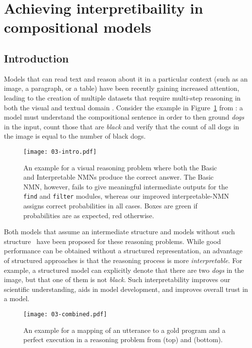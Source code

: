 \documentclass[main.tex]{subfiles}
\begin{document}
\section{Achieving interpretibaility in compositional models} %
\label{sec:nmn-interpret}

\subsection{Introduction}
Models that can read text and reason about it in a particular context (such as an image, a paragraph, or a table) have been recently gaining increased attention, leading to the creation of multiple  datasets that require multi-step reasoning in both the visual and textual domain \cite{clevr-2017,nlvr-suhr-2017,complexweb-talmor-2018,hotpotqa-2018,nlvr2-suhr-2018,gqa-hudson-2019,drop-2019}.
Consider the example in Figure~\ref{fig:03-intro} from \nlvr{}: a model must understand the compositional sentence in order to then ground \emph{dogs} in the input, count those that are \emph{black} and verify that the count of all dogs in the image is equal to the number of black dogs.


%
\begin{figure}[bh!]
    \centering
    \texttt{[image: 03-intro.pdf]}
    \caption{An example for a visual reasoning problem where both the Basic and Interpretable NMNs produce the correct answer.
    The Basic NMN, however, fails to give meaningful intermediate outputs for the \texttt{find} and \texttt{filter} modules, whereas our improved interpretable-NMN assigns correct probabilities in all cases. Boxes are green if probabilities are as expected, red otherwise.}
    \label{fig:03-intro}
\end{figure}


Both models that assume an intermediate structure \cite{nmn-2016,jiang-nmn-2019} and models without such structure~\cite{lxmert-hao-2019,mtmsn-2019,compositional-min-2019} have been proposed for these reasoning problems.
While good performance can be obtained without a structured representation, an advantage of structured approaches is that the reasoning process is more \emph{interpretable}. For example, a structured model can explicitly denote that there are two \emph{dogs} in the image, but that one of them is not \emph{black}. Such interpretability improves our scientific understanding, aids in model development, and improves overall trust in a model.

\begin{figure}[tbh]
\centering
    \texttt{[image: 03-combined.pdf]}
    \caption{An example for a mapping of an utterance to a gold program and a perfect execution in a reasoning problem from \nlvr{} (top) and \drop{} (bottom).}
 \label{fig:03-nmn-example}
\end{figure}
\end{document}
